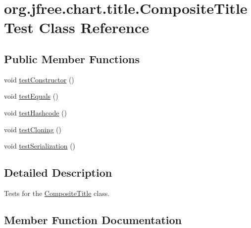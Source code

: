 \hypertarget{classorg_1_1jfree_1_1chart_1_1title_1_1_composite_title_test}{}\section{org.\+jfree.\+chart.\+title.\+Composite\+Title\+Test Class Reference}
\label{classorg_1_1jfree_1_1chart_1_1title_1_1_composite_title_test}
\subsection*{Public Member Functions}
\begin{DoxyCompactItemize}
\item 
void \mbox{\hyperlink{classorg_1_1jfree_1_1chart_1_1title_1_1_composite_title_test_a714bc13860fee593e4d7b3470ef21bc1}{test\+Constructor}} ()
\item 
void \mbox{\hyperlink{classorg_1_1jfree_1_1chart_1_1title_1_1_composite_title_test_aa5a5599ca8f2ca815883530082a6764f}{test\+Equals}} ()
\item 
void \mbox{\hyperlink{classorg_1_1jfree_1_1chart_1_1title_1_1_composite_title_test_a1e99c09742886dfbe1716fe41564826d}{test\+Hashcode}} ()
\item 
void \mbox{\hyperlink{classorg_1_1jfree_1_1chart_1_1title_1_1_composite_title_test_add9e2996fc8df73d150d6c07b60d4bb8}{test\+Cloning}} ()
\item 
void \mbox{\hyperlink{classorg_1_1jfree_1_1chart_1_1title_1_1_composite_title_test_a022388ca660a9d0b7cfb82b766a6a306}{test\+Serialization}} ()
\end{DoxyCompactItemize}


\subsection{Detailed Description}
Tests for the \mbox{\hyperlink{classorg_1_1jfree_1_1chart_1_1title_1_1_composite_title}{Composite\+Title}} class. 

\subsection{Member Function Documentation}
\mbox{\label{classorg_1_1jfree_1_1chart_1_1title_1_1_composite_title_test_add9e2996fc8df73d150d6c07b60d4bb8}} 
